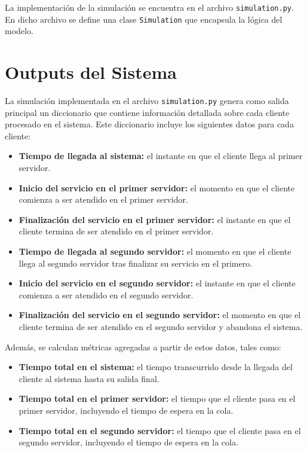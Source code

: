\documentclass[12pt]{article}
\begin{document}
La implementación de la simulación se encuentra en el archivo \texttt{simulation.py}. En dicho archivo se define una clase \texttt{Simulation} que encapsula la lógica del modelo. 

\section{Outputs del Sistema}
La simulación implementada en el archivo \texttt{simulation.py} genera como salida principal un diccionario que contiene información detallada sobre cada cliente procesado en el sistema. Este diccionario incluye los siguientes datos para cada cliente:

\begin{itemize}
    \item \textbf{Tiempo de llegada al sistema:} el instante en que el cliente llega al primer servidor.
    \item \textbf{Inicio del servicio en el primer servidor:} el momento en que el cliente comienza a ser atendido en el primer servidor.
    \item \textbf{Finalización del servicio en el primer servidor:} el instante en que el cliente termina de ser atendido en el primer servidor.
    \item \textbf{Tiempo de llegada al segundo servidor:} el momento en que el cliente llega al segundo servidor tras finalizar su servicio en el primero.
    \item \textbf{Inicio del servicio en el segundo servidor:} el instante en que el cliente comienza a ser atendido en el segundo servidor.
    \item \textbf{Finalización del servicio en el segundo servidor:} el momento en que el cliente termina de ser atendido en el segundo servidor y abandona el sistema.
\end{itemize}

Además, se calculan métricas agregadas a partir de estos datos, tales como:
\begin{itemize}
    \item \textbf{Tiempo total en el sistema:} el tiempo transcurrido desde la llegada del cliente al sistema hasta su salida final.
    \item \textbf{Tiempo total en el primer servidor:} el tiempo que el cliente pasa en el primer servidor, incluyendo el tiempo de espera en la cola.
    \item \textbf{Tiempo total en el segundo servidor:} el tiempo que el cliente pasa en el segundo servidor, incluyendo el tiempo de espera en la cola.
\end{itemize}
\end{document}
